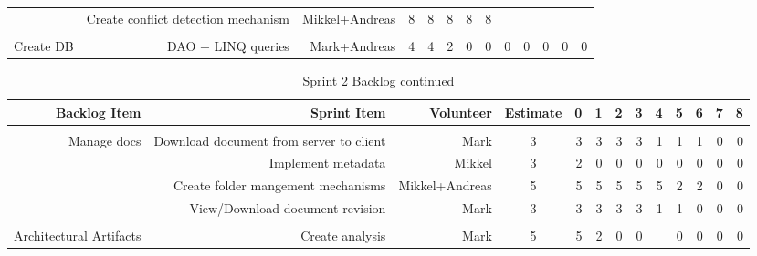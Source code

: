 \documentclass[a4paper,11pt,report]{report}
\begin{document}
\begin{landscape}
\begin{table}[htbp]
\begin{tabular}{rrrrrrrrrrrrr}
          & Create conflict detection mechanism & Mikkel+Andreas & \multicolumn{1}{c}{8} & 8     & 8     & 8     & 8     &       &       &       &       &  \\
          &       &       & \multicolumn{1}{c}{} &       &       &       &       &       &       &       &       &  \\
    Create DB & DAO + LINQ queries & Mark+Andreas & \multicolumn{1}{c}{4} & 4     & 2     & 0     & 0     & 0     & 0     & 0     & 0     & 0 \\
    \end{tabular}%
  \label{tab:addlabel}%
\end{table}%

\begin{table}[htbp]
  \centering
  \caption{Sprint 2 Backlog continued}
    \begin{tabular}{rrrrrrrrrrrrr}
				\hline \hline
    \textbf{Backlog Item} & \textbf{Sprint Item} & \textbf{Volunteer} & \multicolumn{1}{c}{\textbf{Estimate}} & \multicolumn{1}{c}{\textbf{0}} & \multicolumn{1}{c}{\textbf{1}} & \multicolumn{1}{c}{\textbf{2}} & \multicolumn{1}{c}{\textbf{3}} & \multicolumn{1}{c}{\textbf{4}} & \multicolumn{1}{c}{\textbf{5}} & \multicolumn{1}{c}{\textbf{6}} & \multicolumn{1}{c}{\textbf{7}} & \multicolumn{1}{c}{\textbf{8}} \\
				\hline
          &       &       &       &       &       &       &       &       &       &       &       &  \\
    Manage docs & Download document from server to client & Mark  & \multicolumn{1}{c}{3} & 3     & 3     & 3     & 3     & 1     & 1     & 1     & 0     & 0 \\
          & Implement metadata & Mikkel & \multicolumn{1}{c}{3} & 2     & 0     & 0     & 0     & 0     & 0     & 0     & 0     & 0 \\
          & Create folder mangement mechanisms & Mikkel+Andreas & \multicolumn{1}{c}{5} & 5     & 5     & 5     & 5     & 5     & 2     & 2     & 0     & 0 \\
          & View/Download document revision & Mark  & \multicolumn{1}{c}{3} & 3     & 3     & 3     & 3     & 1     & 1     & 0     & 0     & 0 \\
          &       &       & \multicolumn{1}{c}{} &       &       &       &       &       &       &       &       &  \\
    Architectural Artifacts & Create analysis & Mark  & \multicolumn{1}{c}{5} & 5     & 2     & 0     & 0     &       & 0     & 0     & 0     & 0 \\

\end{tabular}
\end{table}
\end{landscape}
\end{document}
